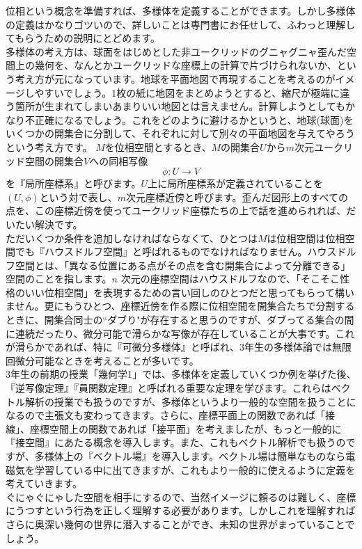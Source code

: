 位相という概念を準備すれば、多様体を定義することができます。しかし多様体の定義はかなりゴツいので、詳しいことは専門書にお任せして、ふわっと理解してもらうための説明にとどめます。\\
多様体の考え方は、球面をはじめとした非ユークリッドのグニャグニャ歪んだ空間上の幾何を、なんとかユークリッドな座標上の計算で片づけられないか、という考え方が元になっています。地球を平面地図で再現することを考えるのがイメージしやすいでしょう。1枚の紙に地図をまとめようとすると、縮尺が極端に違う箇所が生まれてしまいあまりいい地図とは言えません。計算しようとしてもかなり不正確になるでしょう。これをどのように避けるかというと、地球(球面)をいくつかの開集合に分割して、それぞれに対して別々の平面地図を与えてやろうという考え方です。
$M$を位相空間とするとき、$M$の開集合$U$から$m$次元ユークリッド空間の開集合$V$への同相写像
\[
\phi : U \rightarrow V
\]
を『局所座標系』と呼びます。$U$上に局所座標系が定義されていることを$(U,\phi)$という対で表し、$m$次元座標近傍と呼びます。歪んだ図形上のすべての点を、この座標近傍を使ってユークリッド座標たちの上で話を進められれば、だいたい解決です。\\
ただいくつか条件を追加しなければならなくて、ひとつは$M$は位相空間は位相空間でも『ハウスドルフ空間』と呼ばれるものでなければなりません。ハウスドルフ空間とは、「異なる位置にある点がその点を含む開集合によって分離できる」空間のことを指します。$n$ 次元の座標空間はハウスドルフなので、「そこそこ性格のいい位相空間」を表現するための言い回しのひとつだと思ってもらって構いません。更にもうひとつ、座標近傍を作る際に位相空間を開集合たちで分割するときに、開集合同士の``ダブり"が存在すると思うのですが、ダブってる集合の間に連続だったり、微分可能で滑らかな写像が存在していることが大事です。これが滑らかであれば、特に『可微分多様体』と呼ばれ、3年生の多様体論では無限回微分可能なときを考えることが多いです。\\
3年生の前期の授業「幾何学1」では、多様体を定義していくつか例を挙げた後、『逆写像定理』『員関数定理』と呼ばれる重要な定理を学びます。これらはベクトル解析の授業でも扱うのですが、多様体というより一般的な空間を扱うことになるので主張文も変わってきます。さらに、座標平面上の関数であれば「接線」、座標空間上の関数であれば「接平面」を考えましたが、もっと一般的に『接空間』にあたる概念を導入します。また、これもベクトル解析でも扱うのですが、多様体上の『ベクトル場』を導入します。ベクトル場は簡単なものなら電磁気を学習している中に出てきますが、これもより一般的に使えるように定義を考えていきます。\\
ぐにゃぐにゃした空間を相手にするので、当然イメージに頼るのは難しく、座標にうつすという行為を正しく理解する必要があります。しかしこれを理解すればさらに奥深い幾何の世界に潜入することができ、未知の世界がまっていることでしょう。


